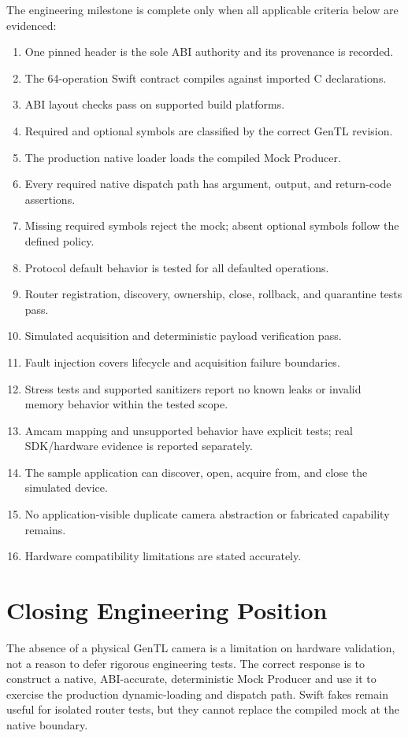 \documentclass[11pt,a4paper]{report}
\begin{document}
The engineering milestone is complete only when all applicable criteria below are evidenced:
\begin{enumerate}
  \item One pinned header is the sole ABI authority and its provenance is recorded.
  \item The 64-operation Swift contract compiles against imported C declarations.
  \item ABI layout checks pass on supported build platforms.
  \item Required and optional symbols are classified by the correct GenTL revision.
  \item The production native loader loads the compiled Mock Producer.
  \item Every required native dispatch path has argument, output, and return-code assertions.
  \item Missing required symbols reject the mock; absent optional symbols follow the defined policy.
  \item Protocol default behavior is tested for all defaulted operations.
  \item Router registration, discovery, ownership, close, rollback, and quarantine tests pass.
  \item Simulated acquisition and deterministic payload verification pass.
  \item Fault injection covers lifecycle and acquisition failure boundaries.
  \item Stress tests and supported sanitizers report no known leaks or invalid memory behavior within the tested scope.
  \item Amcam mapping and unsupported behavior have explicit tests; real SDK/hardware evidence is reported separately.
  \item The sample application can discover, open, acquire from, and close the simulated device.
  \item No application-visible duplicate camera abstraction or fabricated capability remains.
  \item Hardware compatibility limitations are stated accurately.
\end{enumerate}

\chapter{Closing Engineering Position}
The absence of a physical GenTL camera is a limitation on hardware validation, not a reason to defer rigorous engineering tests. The correct response is to construct a native, ABI-accurate, deterministic Mock Producer and use it to exercise the production dynamic-loading and dispatch path. Swift fakes remain useful for isolated router tests, but they cannot replace the compiled mock at the native boundary.
\end{document}

